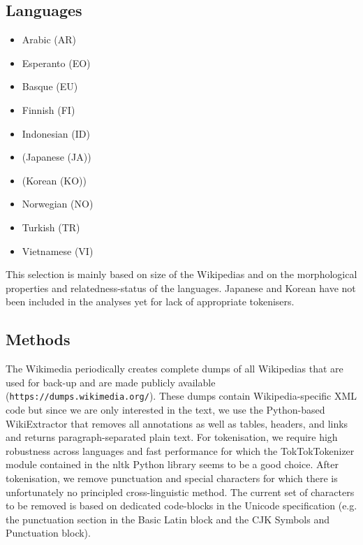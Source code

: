 \documentclass{article}
\begin{document}
\subsection*{Languages}

\begin{itemize}
\item Arabic (AR)
\item Esperanto (EO)
\item Basque (EU)
\item Finnish (FI)
\item Indonesian (ID)
\item (Japanese (JA))
\item (Korean (KO))
\item Norwegian (NO)
\item Turkish (TR)
\item Vietnamese (VI)
\end{itemize}

This selection is mainly based on size of the Wikipedias and on the morphological properties and relatedness-status of the languages. Japanese and Korean have not been included in the analyses yet for lack of appropriate tokenisers.\\

\subsection{Methods}

The Wikimedia periodically creates complete dumps of all Wikipedias that are used for back-up and are made publicly available (\verb|https://dumps.wikimedia.org/|). These dumps contain Wikipedia-specific XML code but since we are only interested in the text, we use the Python-based WikiExtractor \parencite{WikiExtractor} that removes all annotations as well as tables, headers, and links and returns paragraph-separated plain text. For tokenisation, we require high robustness across languages and fast performance for which the TokTokTokenizer module \parencite{dehdari2014neurophysiologically} contained in the nltk Python library seems to be a good choice. After tokenisation, we remove punctuation and special characters for which there is unfortunately no principled cross-linguistic method. The current set of characters to be removed is based on dedicated code-blocks in the Unicode specification (e.g. the punctuation section in the Basic Latin block and the CJK Symbols and Punctuation block).\\
\end{document}
